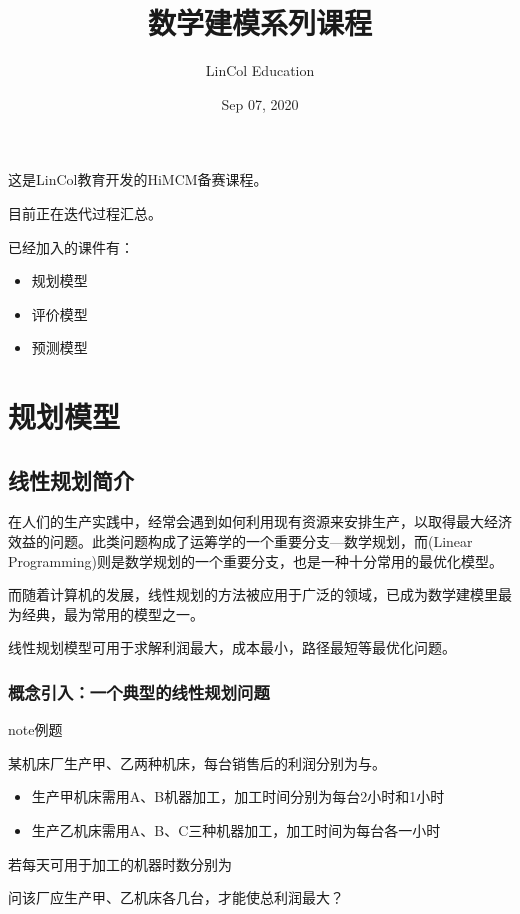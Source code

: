 \documentclass[letterpaper,10pt,english]{sphinxmanual}
\title{数学建模系列课程}
\date{Sep 07, 2020}
\author{LinCol Education}
\begin{document}
\pagestyle{empty}
\sphinxmaketitle
\pagestyle{plain}
\sphinxtableofcontents
\pagestyle{normal}
\label{\detokenize{docs/index::doc}}


这是LinCol教育开发的HiMCM备赛课程。

目前正在迭代过程汇总。

已经加入的课件有：
\begin{itemize}
\item {} 
规划模型

\item {} 
评价模型

\item {} 
预测模型

\end{itemize}


\chapter{规划模型}
\label{\detokenize{docs/LP:id1}}\label{\detokenize{docs/LP::doc}}

\section{线性规划简介}
\label{\detokenize{docs/LP:id2}}
在人们的生产实践中，经常会遇到如何利用现有资源来安排生产，以取得最大经济效益的问题。此类问题构成了运筹学的一个重要分支—数学规划，而(Linear Programming)则是数学规划的一个重要分支，也是一种十分常用的最优化模型。

而随着计算机的发展，线性规划的方法被应用于广泛的领域，已成为数学建模里最为经典，最为常用的模型之一。

线性规划模型可用于求解利润最大，成本最小，路径最短等最优化问题。


\subsection{概念引入：一个典型的线性规划问题}
\label{\detokenize{docs/LP:id3}}
\begin{sphinxadmonition}{note}{例题}

某机床厂生产甲、乙两种机床，每台销售后的利润分别为与。
\begin{itemize}
\item {} 
生产甲机床需用A、B机器加工，加工时间分别为每台2小时和1小时

\item {} 
生产乙机床需用A、B、C三种机器加工，加工时间为每台各一小时

\end{itemize}

若每天可用于加工的机器时数分别为

问该厂应生产甲、乙机床各几台，才能使总利润最大？
\end{sphinxadmonition}
\end{document}
